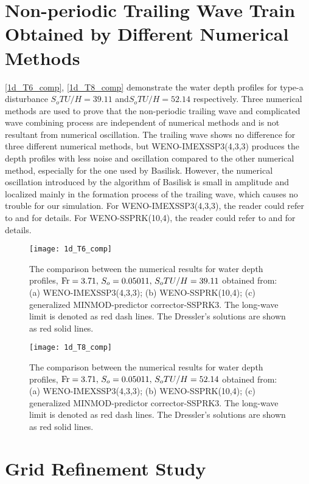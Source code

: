 \documentclass{jfm}
\newcommand{\fr}{{\rm{Fr}}}
\begin{document}
\appendix
\section{Non-periodic Trailing Wave Train Obtained by Different Numerical Methods}\label{appA}
\autoref{1d_T6_comp}, \autoref{1d_T8_comp} demonstrate the water depth profiles for type-a disturbance  $S_oTU/H=39.11$ and$S_oTU/H=52.14$  respectively. Three numerical methods are used to prove that the non-periodic trailing wave and complicated wave combining process are independent of numerical methods and is not resultant from numerical oscillation. The trailing wave shows no difference for three different numerical methods, but WENO-IMEXSSP3(4,3,3) produces the depth profiles with less noise and oscillation compared to the other numerical method, especially for the one used by Basilisk. However, the numerical oscillation introduced by the algorithm of Basilisk is small in amplitude and localized mainly in the formation process of the trailing wave, which causes no trouble for our simulation. For  WENO-IMEXSSP3(4,3,3), the reader could refer to \cite{Yu2021} and  \cite{Pareschi2005} for details. For  WENO-SSPRK(10,4), the reader could refer to \cite{KetParLev13} and  \cite{Ketcheson2008} for details.
 
\begin{figure}
	\centerline{\texttt{[image: 1d\_T6\_comp]}}
	\caption{The comparison between the numerical results for water depth profiles, $\fr=3.71,\,S_o=0.05011,\,S_oTU/H=39.11$ obtained from: (a) WENO-IMEXSSP3(4,3,3); (b) WENO-SSPRK(10,4); (c) generalized MINMOD-predictor corrector-SSPRK3. The long-wave limit is denoted as red dash lines. The Dressler's solutions are shown as red solid lines.} 
	\label{1d_T6_comp}
\end{figure}

\begin{figure}
	\centerline{\texttt{[image: 1d\_T8\_comp]}}
	\caption{The comparison between the numerical results for water depth profiles, $\fr=3.71,\,S_o=0.05011,\,S_oTU/H=52.14$ obtained from: (a) WENO-IMEXSSP3(4,3,3); (b) WENO-SSPRK(10,4); (c) generalized MINMOD-predictor corrector-SSPRK3. The long-wave limit is denoted as red dash lines. The Dressler's solutions are shown as red solid lines.} 
	\label{1d_T8_comp}
\end{figure}

\section{Grid Refinement Study}
\label{grs}
\end{document}
